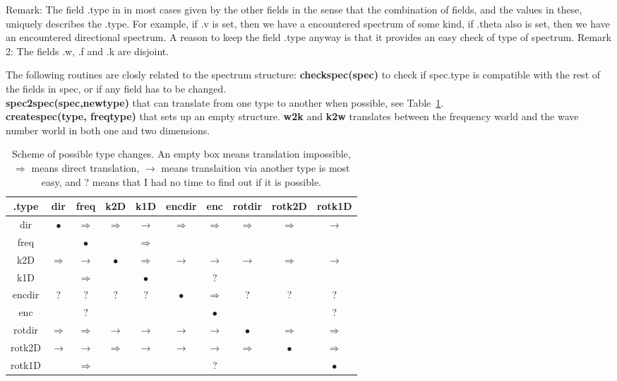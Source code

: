 \documentclass{article}
\begin{document}
Remark: The field .type in in most cases given by the other fields in 
the sense that the combination of fields, and the values in these,
uniquely describes the .type.  For example, if .v is set, then we have a 
encountered spectrum of some kind, if .theta also is set, then we have
an encountered directional spectrum. A reason to keep the field .type anyway
is that it provides an easy check of type of spectrum.
Remark 2: The fields .w, .f and .k are disjoint.

The following routines are closly related to the spectrum structure:
\textbf{checkspec(spec)} to check if  spec.type is compatible with the
rest of the fields in spec, or if any field has to be changed.\\
\textbf{spec2spec(spec,newtype)} that can
translate from one type to another when possible, see
Table~\ref{tab:changes}.\\
\textbf{createspec(type, freqtype)} that sets up an empty structure.
\textbf{w2k} and \textbf{k2w} translates between the frequency world
and the wave number world in both one and two dimensions.
\begin{table}[htbp]
  \begin{center}
\begin{tabular}[h]{|c||c|c|c|c|c|c|c|c|c|}
\hline .type & dir & freq & k2D & k1D & encdir & enc & rotdir &
rotk2D & rotk1D\\\hline\hline
dir & $\bullet$ &$\Rightarrow$&  $\Rightarrow$ &  $\rightarrow$ &
$\Rightarrow$ &  $\Rightarrow$ &  $\Rightarrow$ &  $\Rightarrow$ &
$\rightarrow$ \\ \hline
freq & & $\bullet$ & &  $\Rightarrow$ & & & &&\\\hline
k2D &  $\Rightarrow$ &  $\rightarrow$ &  $\bullet$ &
$\Rightarrow$ &  $\rightarrow$ & $\rightarrow$ &  $\rightarrow$ &
$\Rightarrow$ &  $\rightarrow$ \\\hline
k1D & &  $\Rightarrow$ && $\bullet$ &&?&&&\\\hline
encdir & ? & ? & ? & ? &  $\bullet$ &  $\Rightarrow$ & ? & ? & ?
\\\hline
enc & & ? & & & & $\bullet$ & & & ?\\\hline
rotdir &  $\Rightarrow$ &  $\Rightarrow$ &  $\rightarrow$ &
$\rightarrow$ &  $\rightarrow$ &  $\rightarrow$ &  $\bullet$ &
$\Rightarrow$ & $\Rightarrow$ \\\hline
rotk2D&  $\rightarrow$ &  $\rightarrow$ &  $\Rightarrow$ &
$\rightarrow$ &  $\rightarrow$ & $\rightarrow$ &  $\Rightarrow$ &
$\bullet$ &  $\Rightarrow$ \\\hline
rotk1D & &  $\Rightarrow$ &&  &&?&&& $\bullet$ \\\hline
\end{tabular}
    \caption{Scheme of possible type changes. An empty box means
      translation impossible,  $\Rightarrow$ means
      direct translation, $\rightarrow$ means translaition via another 
      type is most easy, and ? means that I had no time to find out if it is possible. }
    \label{tab:changes}
  \end{center}
\end{table}
\end{document}
